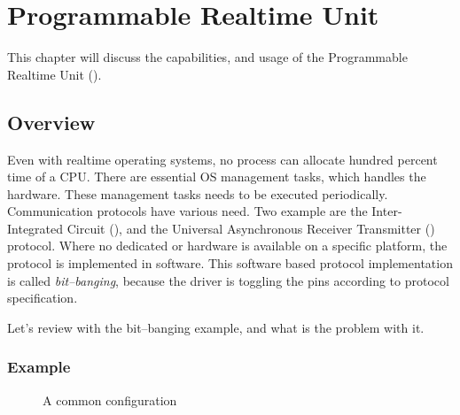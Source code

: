 \chapter{Programmable Realtime Unit}
\label{chap:pru}

This chapter will discuss the capabilities, and usage of the Programmable Realtime Unit ().

\section{Overview}

Even with realtime operating systems, no process can allocate hundred percent time of a CPU. There are essential OS management tasks, which handles the hardware. These management tasks needs to be executed periodically.
\\[1ex]
Communication protocols have various need. Two example are the Inter-Integrated Circuit (\isc), and the Universal Asynchronous Receiver Transmitter (\uart) protocol. Where no dedicated \isc or \uart hardware is available on a specific platform, the protocol is implemented in software. This software based protocol implementation is called \emph{bit--banging}, because the driver is toggling the \gpio pins according to protocol specification.

Let's review with the \uart bit--banging example, and what is the problem with it.

\subsection{Example}

\begin{figure}[h]
	\centering
	\caption{A common \uart configuration}
	\label{fig:example_uart}
\end{figure}

